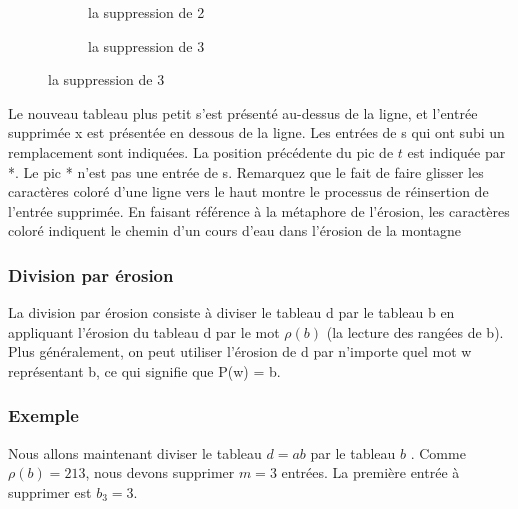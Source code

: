 \begin{figure}[!ht]
\begin{subfigure}[b]{0.4\linewidth}
		\caption{la suppression de 2}
		\label{fig:tab18}
	\end{subfigure}
	\label{fig:tab19}
	\begin{subfigure}[b]{0.4\linewidth}
		\centering
		\caption{la suppression de 3}
		\label{fig:tab20}
	\end{subfigure}
	\label{fig:tabs12}
\end{figure}
\pagebreak

Le nouveau tableau plus petit s'est présenté au-dessus de la ligne, et l'entrée supprimée x est présentée en dessous de la ligne. 
Les entrées de s qui ont subi un remplacement sont indiquées. 
La position précédente du pic de $t$ est indiquée par *. 
Le pic * n'est pas une entrée de s.
Remarquez que le fait de faire glisser les caractères coloré d'une ligne vers le haut montre le processus de réinsertion de l'entrée supprimée. 
En faisant référence à la métaphore de l'érosion, les caractères coloré indiquent le chemin d'un cours d'eau dans l'érosion de la montagne

\subsubsection{Division par érosion}
La division par érosion consiste à diviser le tableau d par le tableau b en appliquant l'érosion du tableau d par le mot $\rho(b)$ (la lecture des rangées de b). 
Plus généralement, on peut utiliser l'érosion de d par n'importe quel mot w représentant b, ce qui signifie que P(w) = b.

\subsubsection{Exemple}
Nous allons maintenant diviser le tableau $d = ab$  par le tableau $b$ . Comme $\rho(b) = 213$, nous devons supprimer $m = 3$ entrées. La première entrée à supprimer est $b_3 = 3$.

